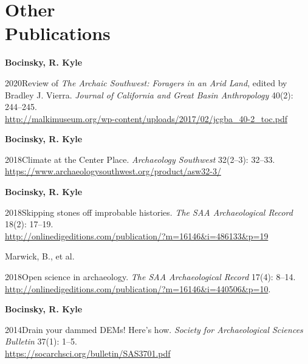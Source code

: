 \section{Other \\ Publications}

{\bf Bocinsky, R. Kyle}
\begin{list1}
\item[] 2020\hspace{.2cm}Review of \emph{The Archaic Southwest: Foragers in an Arid Land}, edited by Bradley J. Vierra. \emph{Journal of California and Great Basin Anthropology} 40(2): 244–245.\\\href{http://malkimuseum.org/wp-content/uploads/2017/02/jcgba\_40-2\_toc.pdf}{http://malkimuseum.org/wp-content/uploads/2017/02/jcgba\_40-2\_toc.pdf}
\end{list1}


{\bf Bocinsky, R. Kyle}
\begin{list1}
\item[] 2018\hspace{.2cm}Climate at the Center Place. \emph{Archaeology Southwest} 32(2–3): 32–33.\\\href{https://www.archaeologysouthwest.org/product/asw32-3/}{https://www.archaeologysouthwest.org/product/asw32-3/}
\end{list1}


{\bf Bocinsky, R. Kyle}
\begin{list1}
\item[] 2018\hspace{.2cm}Skipping stones off improbable histories. \emph{The SAA Archaeological Record} 18(2): 17–19.\\\href{http://onlinedigeditions.com/publication/?m=16146\&i=486133\&p=19}{http://onlinedigeditions.com/publication/?m=16146\&i=486133\&p=19}
\end{list1}


Marwick, B., et al.
\begin{list1}
\item[] 2018\hspace{.2cm}Open science in archaeology. \emph{The SAA Archaeological Record} 17(4): 8–14.\\\href{http://onlinedigeditions.com/publication/?m=16146\&i=440506\&p=10}{http://onlinedigeditions.com/publication/?m=16146\&i=440506\&p=10}.
\end{list1}


{\bf Bocinsky, R. Kyle}
\begin{list1}
\item[] 2014\hspace{.2cm}Drain your dammed DEMs! Here's how. \emph{Society for Archaeological Sciences Bulletin} 37(1): 1–5.\\\href{https://socarchsci.org/bulletin/SAS3701.pdf}{https://socarchsci.org/bulletin/SAS3701.pdf}
\end{list1}
